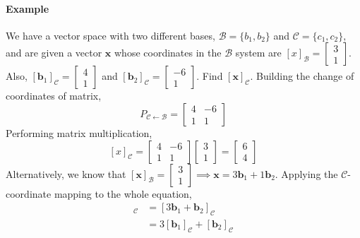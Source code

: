 \documentclass[../linear-algebra.tex]{subfiles}
\begin{document}
\paragraph{Example} We have a vector space with two different bases, $\mathcal{B} = \{b_1, b_2\}$ and $\mathcal{C} = \{c_1, c_2\}$, 
and are given a vector $\mathbf{x}$ whose coordinates in the $\mathcal{B}$ system are $[x]_{\mathcal{B}} = \begin{bmatrix} 3 \\ 1 \end{bmatrix}$.\newline
Also, $[\mathbf{b}_1]_{\mathcal{C}} = \begin{bmatrix} 4 \\ 1 \end{bmatrix}$ and $[\mathbf{b}_2]_{\mathcal{C}} = \begin{bmatrix} -6 \\ 1 \end{bmatrix}$. Find $[\mathbf{x}]_{\mathcal{C}}$.\newline
Building the change of coordinates of matrix,
$$P_{\mathcal{C}\leftarrow\mathcal{B}} = \begin{bmatrix} 4 & -6 \\ 1 & 1 \end{bmatrix}$$
Performing matrix multiplication,
$$[x]_{\mathcal{C}} = \begin{bmatrix} 4 & -6 \\ 1 & 1 \end{bmatrix} \begin{bmatrix} 3 \\ 1 \end{bmatrix} = \begin{bmatrix} 6 \\ 4 \end{bmatrix}$$
Alternatively, we know that $[\mathbf{x}]_{\mathcal{B}} = \begin{bmatrix} 3 \\ 1 \end{bmatrix} \implies \mathbf{x} = 3\mathbf{b}_1 + 1\mathbf{b}_2$.\newline
Applying the $\mathcal{C}$-coordinate mapping to the whole equation,
\begin{align*}
    [\mathbf{x}]_{\mathcal{C}} &= [3\mathbf{b}_1 + \mathbf{b}_2]_{\mathcal{C}} \\
    &= 3[\mathbf{b}_1]_{\mathcal{C}} + [\mathbf{b}_2]_{\mathcal{C}} \\
\end{align*}
\end{document}
